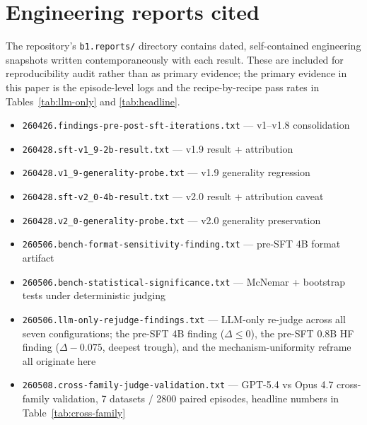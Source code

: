 \documentclass[10pt]{article}
\begin{document}
\section{Engineering reports cited}\label{app:reports}
The repository's \texttt{b1.reports/} directory contains dated, self-contained engineering snapshots written contemporaneously with each result. These are included for reproducibility audit rather than as primary evidence; the primary evidence in this paper is the episode-level logs and the recipe-by-recipe pass rates in Tables~\ref{tab:llm-only} and \ref{tab:headline}.
\begin{itemize}[leftmargin=*,nosep]
  \item \texttt{260426.findings-pre-post-sft-iterations.txt} --- v1--v1.8 consolidation
  \item \texttt{260428.sft-v1\_9-2b-result.txt} --- v1.9 result + attribution
  \item \texttt{260428.v1\_9-generality-probe.txt} --- v1.9 generality regression
  \item \texttt{260428.sft-v2\_0-4b-result.txt} --- v2.0 result + attribution caveat
  \item \texttt{260428.v2\_0-generality-probe.txt} --- v2.0 generality preservation
  \item \texttt{260506.bench-format-sensitivity-finding.txt} --- pre-SFT 4B format artifact
  \item \texttt{260506.bench-statistical-significance.txt} --- McNemar + bootstrap tests under deterministic judging
  \item \texttt{260506.llm-only-rejudge-findings.txt} --- LLM-only re-judge across all seven configurations; the pre-SFT 4B finding ($\Delta \leq 0$), the pre-SFT 0.8B HF finding ($\Delta -0.075$, deepest trough), and the mechanism-uniformity reframe all originate here
  \item \texttt{260508.cross-family-judge-validation.txt} --- GPT-5.4 vs Opus 4.7 cross-family validation, 7 datasets / 2800 paired episodes, headline numbers in Table~\ref{tab:cross-family}
\end{itemize}
\end{document}
